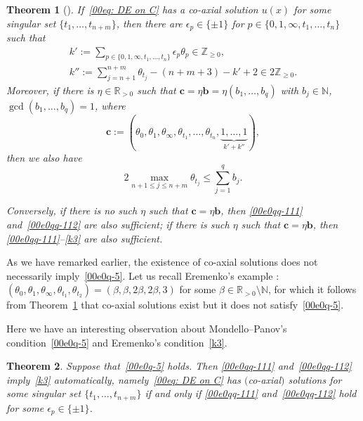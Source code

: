 \documentclass[10pt,a4paper]{amsart}
\numberwithin{equation}{section}
\newtheorem{Theorem}{Theorem}[section]
\def\N{\mathbb N}
\begin{document}
\begin{Theorem}[\cite{Coaxial}]\label{thm-Eremenko}
If~\eqref{00eq: DE on C} has a co-axial solution $u(x)$ for some singular set $\{t_1,\dots,t_{n+m}\}$, then
 there are $\epsilon_{p}\in\{\pm 1\}$ for $p\in
 \{0,1,\infty,t_1,\dots,t_n\}$ such that
\begin{gather}
k':=\sum_{p\in\{0,1,\infty,t_1,\dots,t_n\}} \epsilon_{p}\theta_{p}\in\mathbb{Z}_{\geq 0},\label{00e0qq-111}
\\
k'':=\sum_{j=n+1}^{n+m} \theta_{t_j}-(n+m+3)-k'+2\in 2\mathbb{Z}_{\geq 0}.\label{00e0qq-112}
\end{gather}
Moreover, if there is $\eta\in\mathbb{R}_{>0}$ such that
$\mathbf{c}=\eta\mathbf{b}=\eta(b_1,\dots,b_q)$ with
$b_j\in\mathbb{N}$, $\gcd(b_1,\dots,b_q)=1$, where
\[
 \boldsymbol c:=(\theta_0,\theta_1,\theta_\infty,\theta_{t_1},
 \dots,\theta_{t_n},\underbrace{1,\dots,1}_{k'+k''}),
\]
then we also have
\begin{equation}\label{k3}
 2\max_{n+1\leq j\leq {n+m}}\theta_{t_j}\leq \sum_{j=1}^q b_j.
\end{equation}



Conversely, if there is no such $\eta$ such that
$\mathbf{c}=\eta\mathbf{b}$, then
\eqref{00e0qq-111} and~\eqref{00e0qq-112} are also sufficient; if there
is such $\eta$ such that $\mathbf{c}=\eta\mathbf{b}$, then
\eqref{00e0qq-111}--\eqref{k3} are also sufficient.
\end{Theorem}

As we have remarked earlier, the existence of co-axial solutions does
not necessarily imply~\eqref{00e0q-5}. Let us recall Eremenko's
example \cite{Coaxial}:
$(\theta_0,\theta_1,\theta_\infty,\theta_{t_1},\theta_{t_2})=(\beta,\beta,2\beta,2\beta,3)$
for some $\beta\in\mathbb{R}_{>0}\setminus\N$, for which it follows
from Theorem~\ref{thm-Eremenko} that co-axial solutions exist but it
does not satisfy~\eqref{00e0q-5}.

Here we have an interesting observation about Mondello--Panov's
condition~\eqref{00e0q-5} and Eremenko's condition~\eqref{k3}.

\begin{Theorem}\label{thm-MP-E}
Suppose that~\eqref{00e0q-5} holds. Then
\eqref{00e0qq-111} and~\eqref{00e0qq-112} imply~\eqref{k3} automatically,
namely~\eqref{00eq: DE on C} has $($co-axial$)$ solutions for some
singular set $\{t_1,\dots,t_{n+m}\}$ if and only if
\eqref{00e0qq-111} and~\eqref{00e0qq-112} hold for some
$\epsilon_p\in\{\pm 1\}$.
\end{Theorem}
\end{document}
